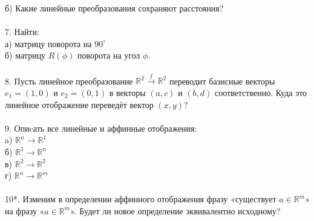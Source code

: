 \documentclass[12pt]{article}
\begin{document}
б) Какие линейные преобразования сохраняют расстояния?\\
\\
7. Найти:\\ а) матрицу поворота на $90^\circ$\\
б) матрицу $R(\phi)$ поворота на угол $\phi$.\\
\\
8. Пусть линейное преобразование $\mathbb{R}^2 \xrightarrow{f}\mathbb{R}^2$ переводит базисные векторы $e_1 = (1,0)$ и $e_2 = (0,1)$ в векторы $(a,c)$ и $(b,d)$ соответственно. Куда это линейное отображение переведёт вектор $(x,y)$?\\
\\
9. Опиcать все линейные и аффинные отображения:\\
a) $\mathbb{R}^n \to \mathbb{R}^1$\\
б) $\mathbb{R}^1 \to \mathbb{R}^n$\\
в) $\mathbb{R}^2 \to \mathbb{R}^2$\\
г) $\mathbb{R}^n \to \mathbb{R}^m$\\
\\
10*. Изменим в определении аффинного отображения фразу «существует $a \in \mathbb{R}^m$» на фразу «$a \in \mathbb{R}^m$». Будет ли новое определение эквивалентно исходному?
\end{document}
